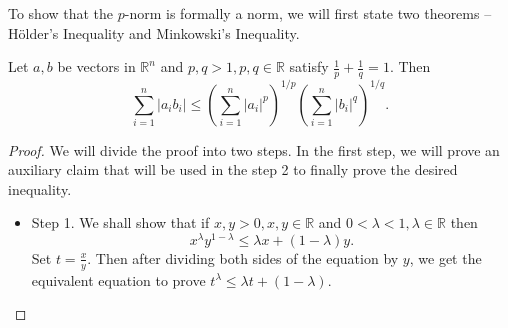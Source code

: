 To show that the $p$-norm is formally a norm, we will first state two theorems -- H\"older's Inequality and Minkowski's Inequality.

\begin{theorem}
	\label{theorem:holdersInequality}
	Let $a,b$ be vectors in $\mathbb{R}^n$ and $p,q > 1, p,q \in \mathbb{R}$ satisfy $\frac{1}{p}+\frac{1}{q}=1$. Then
	\begin{equation}
	\sum_{i=1}^{n}|a_ib_i| \le {\left( \sum_{i=1}^{n}|a_i|^p \right)}^{1/p} {\left( \sum_{i=1}^{n}|b_i|^q \right)}^{1/q}.
	\end{equation}
	\begin{proof}
		We will divide the proof into two steps. In the first step, we will prove an auxiliary claim that will be used in the step 2 to finally prove the desired inequality.
		\begin{itemize}
			\item Step 1.		
			We shall show that if $x,y > 0, x,y \in \mathbb{R}$ and $0 < \lambda < 1, \lambda \in \mathbb{R}$ then
			\begin{equation}
			x^{\lambda}y^{1-\lambda} \le \lambda x + (1-\lambda)y.
			\end{equation}
			Set $t=\frac{x}{y}$. Then after dividing both sides of the equation by $y$, we get the equivalent equation to prove $t^{\lambda} \le \lambda t + (1-\lambda)$.
			

\end{itemize}
\end{proof}
\end{theorem}
